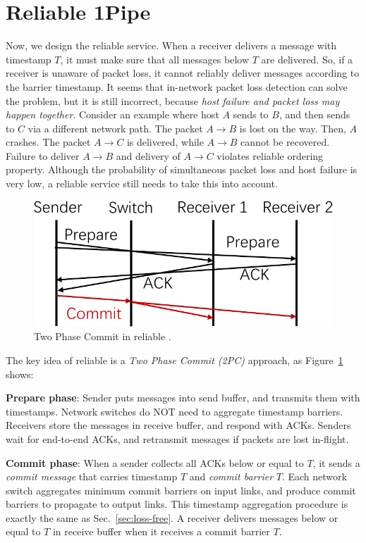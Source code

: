 \section{Reliable 1Pipe}
\label{sec:reliable}

Now, we design the reliable \sys{} service.
When a receiver delivers a message with timestamp $T$, it must make sure that all messages below $T$ are delivered.
So, if a receiver is unaware of packet loss, it cannot reliably deliver messages according to the barrier timestamp.
It seems that in-network packet loss detection can solve the problem, but it is still incorrect, because \emph{host failure and packet loss may happen together}.
Consider an example where host $A$ sends to $B$, and then sends to $C$ via a different network path. The packet $A \rightarrow B$ is lost on the way. Then, $A$ crashes. The packet $A \rightarrow C$ is delivered, while $A \rightarrow B$ cannot be recovered. Failure to deliver $A \rightarrow B$ and delivery of $A \rightarrow C$ violates reliable ordering property.
Although the probability of simultaneous packet loss and host failure is very low, a reliable service still needs to take this into account.


\begin{figure}[t]
\centering
	\includegraphics[width=.3\textwidth]{images/2PC.pdf}
	\vspace{-0.5em}
	\caption{Two Phase Commit in reliable \sys{}.}
	\label{fig:2PC}
	\vspace{-1.5em}
\end{figure}

The key idea of reliable \sys{} is a \emph{Two Phase Commit (2PC)} approach, as Figure~\ref{fig:2PC} shows:

\begin{ecompact}
\item \textbf{Prepare phase}: Sender puts messages into send buffer, and transmits them with timestamps. Network switches do NOT need to aggregate timestamp barriers. Receivers store the messages in receive buffer, and respond with ACKs. Senders wait for end-to-end ACKs, and retransmit messages if packets are lost in-flight.
\item \textbf{Commit phase}: When a sender collects all ACKs below or equal to $T$, it sends a \emph{commit message} that carries timestamp $T$ and \emph{commit barrier} $T$. Each network switch aggregates minimum commit barriers on input links, and produce commit barriers to propagate to output links. This timestamp aggregation procedure is exactly the same as Sec.~\ref{sec:loss-free}. A receiver delivers messages below or equal to $T$ in receive buffer when it receives a commit barrier $T$.
\end{ecompact}




